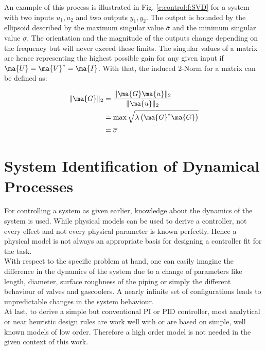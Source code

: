 An example of this process is illustrated in Fig. \ref{c:control:f:SVD} for a system with two inputs $u_1,u_2$ and two outputs $y_1,y_2$. The output is bounded by the ellipsoid described by the maximum singular value $\overline{\sigma}$ and the minimum singular value $\underline{\sigma}$. The orientation and the magnitude of the outputs change depending on the frequency but will never exceed these limits. The singular values of a matrix are hence representing the highest possible gain for any given input if $\ma{U} = \ma{V}^* = \ma{I}$. With that, the induced 2-Norm for a matrix can be defined as:

\begin{align}
\begin{split}
\lVert \ma{G} \rVert_2 &= \frac{\lVert \ma{G}\ma{u}\rVert_2}{\lVert \ma{u} \rVert_2} \\
&= \max \sqrt{\lambda\left( \ma{G}^* \ma{G}\right)} \\
&= \overline{\sigma}
\end{split}
\label{c:control:e:MaxSingularValue}
\end{align}

\section{System Identification of Dynamical Processes}\label{c:control:s:identification}

For controlling a system as given earlier, knowledge about the dynamics of the system is used. While physical models can be used to derive a controller, not every effect and not every physical parameter is known perfectly. Hence a physical model is not always an appropriate basis for designing a controller fit for the task.\\

With respect to the specific problem at hand, one can easily imagine the difference in the dynamics of the system due to a change of parameters like length, diameter, surface roughness of the piping or simply the different behaviour of valves and gascoolers. A nearly infinite set of configurations leads to unpredictable changes in the system behaviour. \\

At last, to derive a simple but conventional PI or PID controller, most analytical or near heuristic design rules are work well with or are based on simple, well known models of low order. Therefore a high order model is not needed in the given context of this work.\\ 

